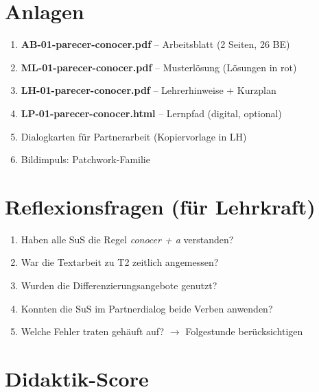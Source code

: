 \documentclass[11pt,a4paper]{article}
\begin{document}
\section{Anlagen}

\begin{enumerate}
    \item \textbf{AB-01-parecer-conocer.pdf} -- Arbeitsblatt (2 Seiten, 26 BE)
    \item \textbf{ML-01-parecer-conocer.pdf} -- Musterlösung (Lösungen in rot)
    \item \textbf{LH-01-parecer-conocer.pdf} -- Lehrerhinweise + Kurzplan
    \item \textbf{LP-01-parecer-conocer.html} -- Lernpfad (digital, optional)
    \item Dialogkarten für Partnerarbeit (Kopiervorlage in LH)
    \item Bildimpuls: Patchwork-Familie
\end{enumerate}

\section{Reflexionsfragen (für Lehrkraft)}

\begin{enumerate}
    \item Haben alle SuS die Regel \textit{conocer + a} verstanden?
    \item War die Textarbeit zu T2 zeitlich angemessen?
    \item Wurden die Differenzierungsangebote genutzt?
    \item Konnten die SuS im Partnerdialog beide Verben anwenden?
    \item Welche Fehler traten gehäuft auf? $\rightarrow$ Folgestunde berücksichtigen
\end{enumerate}

\newpage
\section{Didaktik-Score}
\end{document}
